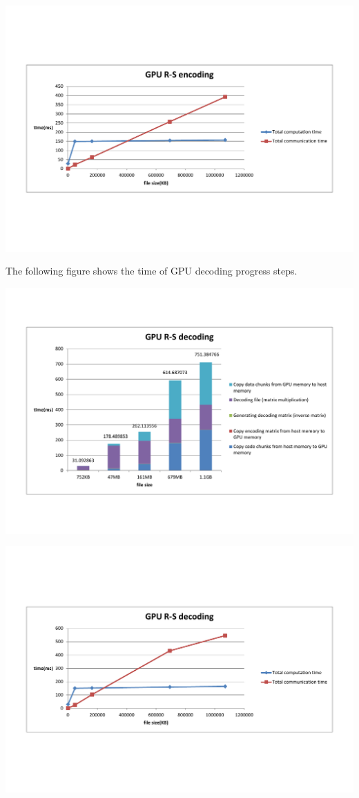 \documentclass[a4paper]{article}
\begin{document}
\includegraphics[scale=0.42]{result-graph/GPU-RS-encode.pdf}

The following figure shows the time of GPU decoding progress steps.

\includegraphics[scale=0.48]{result-graph/GPU-decode-steps.pdf}

\includegraphics[scale=0.42]{result-graph/GPU-RS-decode.pdf}
\end{document}
